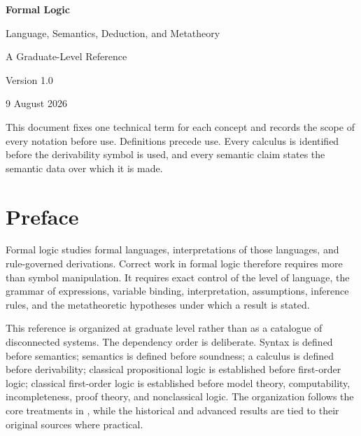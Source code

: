 \documentclass[11pt,oneside,openany]{book}
\theoremstyle{definition}
\theoremstyle{plain}
\theoremstyle{remark}
\begin{document}
\hypersetup{pageanchor=false}
\begin{titlepage}
  \centering
  \vspace*{2.2cm}
  {\Huge\bfseries Formal Logic\par}
  \vspace{0.6cm}
  {\LARGE Language, Semantics, Deduction, and Metatheory\par}
  \vspace{1.2cm}
  {\Large A Graduate-Level Reference\par}
  \vfill
  {\large Version 1.0\par}
  \vspace{0.2cm}
  {\large 9 August 2026\par}
  \vfill
  \begin{minipage}{0.82\textwidth}
  \small
  This document fixes one technical term for each concept and records the scope
  of every notation before use.  Definitions precede use.
  Every calculus is identified before the derivability symbol is used, and
  every semantic claim states the semantic data over which it is made.
  \end{minipage}
\end{titlepage}

\frontmatter
\hypersetup{pageanchor=true}

\chapter*{Preface}

Formal logic studies formal languages, interpretations of those languages,
and rule-governed derivations.  Correct work in formal logic therefore requires
more than symbol manipulation.  It requires exact control of the level of
language, the grammar of expressions, variable binding, interpretation,
assumptions, inference rules, and the metatheoretic hypotheses under which a
result is stated.

This reference is organized at graduate level rather than as a catalogue of
disconnected systems.  The dependency order is deliberate.  Syntax is
defined before semantics; semantics is defined before soundness; a calculus is
defined before derivability; classical propositional logic is established
before first-order logic; classical first-order logic is established before
model theory, computability, incompleteness, proof theory, and nonclassical
logic.  The organization follows the core treatments in
\cite{Enderton2001,EbbinghausFlumThomas1994,OpenLogic2026,Marker2024}, while the
historical and advanced results are tied to their original sources where
practical.
\end{document}
